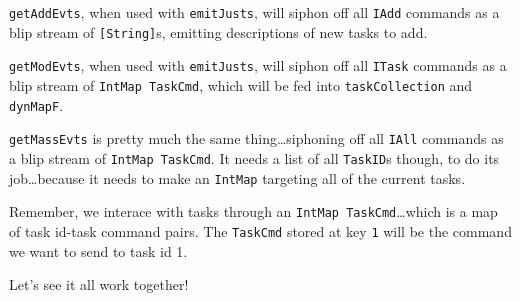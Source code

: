 \documentclass[]{article}
\begin{document}
\texttt{getAddEvts}, when used with \texttt{emitJusts}, will siphon off all
\texttt{IAdd} commands as a blip stream of \texttt{{[}String{]}}s, emitting
descriptions of new tasks to add.

\texttt{getModEvts}, when used with \texttt{emitJusts}, will siphon off all
\texttt{ITask} commands as a blip stream of \texttt{IntMap\ TaskCmd}, which will
be fed into \texttt{taskCollection} and \texttt{dynMapF}.

\texttt{getMassEvts} is pretty much the same thing\ldots siphoning off all
\texttt{IAll} commands as a blip stream of \texttt{IntMap\ TaskCmd}. It needs a
list of all \texttt{TaskID}s though, to do its job\ldots because it needs to
make an \texttt{IntMap} targeting all of the current tasks.

Remember, we interace with tasks through an \texttt{IntMap\ TaskCmd}\ldots which
is a map of task id-task command pairs. The \texttt{TaskCmd} stored at key
\texttt{1} will be the command we want to send to task id 1.

Let's see it all work together!
\end{document}

